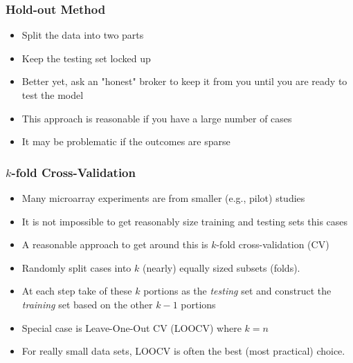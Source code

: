 \documentclass[xcolor=x11names,compress]{beamer}\usepackage[]{graphicx}\usepackage[]{color}
\begin{document}
\begin{frame}
  \frametitle{Hold-out Method}
  \begin{itemize}
\item Split the data into two parts
\item Keep the testing set locked up
\item Better yet, ask an "honest" broker to keep it from you until
      you are ready to test the model
\item This approach is reasonable if you have a large number of cases
\item It may be problematic if the outcomes are sparse

\end{itemize}
\end{frame}

\begin{frame}
  \frametitle{$k$-fold Cross-Validation}
  \begin{itemize}
\item Many microarray experiments are from smaller (e.g., pilot)
      studies
\item It is not impossible to get reasonably size training and testing
      sets this cases 
\item A reasonable approach to get around this is $k$-fold cross-validation (CV)
\item Randomly split cases into $k$ (nearly) equally sized subsets (folds).
\item At each step take of these $k$ portions as the {\it testing} set and 
      construct the {\it training} set based on the other $k-1$ portions
\item Special case is Leave-One-Out CV (LOOCV) where $k=n$
\item For really small data sets, LOOCV is often the best (most practical) choice.
 \end{itemize}
\end{frame}
\end{document}

